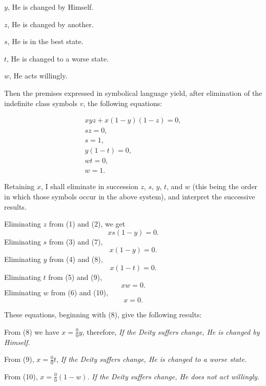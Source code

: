 \documentclass[oneside]{book}
\begin{document}
$y$, He is changed by Himself.

$z$, He is changed by another.

$s$, He is in the best state.

$t$, He is changed to a worse state.

$w$, He acts willingly.

Then the premises expressed in symbolical language yield, after
elimination of the indefinite class symbols $v$, the following equations:

\setcounter{equation}{0}
\begin{eqnarray}
   xyz+x(1-y)(1-z) = 0,\\
   sz = 0,             \\
   s = 1,              \\
   y(1-t) = 0,         \\
   wt = 0,             \\
   w = 1.
\end{eqnarray}

Retaining $x$, I shall eliminate in succession $z$, $s$, $y$, $t$, and $w$ (this
being the order in which those symbols occur in the above system),
and interpret the successive results.

Eliminating $z$ from (1) and (2), we get
\begin{equation}
     xs(1-y) = 0.
\end{equation}
Eliminating $s$ from (3) and (7),
\begin{equation}
     x(1-y) = 0.
\end{equation}
Eliminating $y$ from (4) and (8),
\begin{equation}
     x(1-t) = 0.
\end{equation}
Eliminating $t$ from (5) and (9),
\begin{equation}
     xw = 0.
\end{equation}
Eliminating $w$ from (6) and (10),
\begin{equation}
     x = 0.
\end{equation}

These equations, beginning with (8), give the following
results:

From (8) we have $x = \frac{0}{0}y$, therefore, \textit{If the Deity suffers
change, He is changed by Himself.}

From (9), $x = \frac{0}{0}t$, \textit{If the Deity suffers change, He is changed
to a worse state.}

From (10), $x = \frac{0}{0}(1-w)$. \textit{If the Deity suffers change, He
does not act willingly.}
\end{document}
